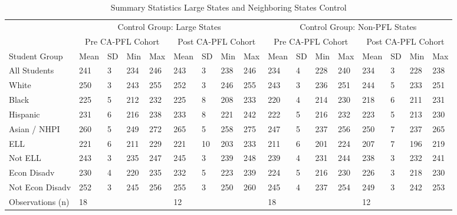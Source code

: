 \begin{table}[!h]
\centering
\caption{Summary Statistics Large States and Neighboring States Control}
\centering
\begin{tabular}[t]{lllllllllllllllll}
\toprule
\multicolumn{1}{c}{ } & \multicolumn{8}{c}{Control Group: Large States} & \multicolumn{8}{c}{Control Group: Non-PFL States} \\
\cmidrule(l{3pt}r{3pt}){2-9} \cmidrule(l{3pt}r{3pt}){10-17}
\multicolumn{1}{c}{ } & \multicolumn{4}{c}{Pre CA-PFL Cohort} & \multicolumn{4}{c}{Post CA-PFL Cohort} & \multicolumn{4}{c}{Pre CA-PFL Cohort} & \multicolumn{4}{c}{Post CA-PFL Cohort} \\
\cmidrule(l{3pt}r{3pt}){2-5} \cmidrule(l{3pt}r{3pt}){6-9} \cmidrule(l{3pt}r{3pt}){10-13} \cmidrule(l{3pt}r{3pt}){14-17}
Student Group & Mean & SD & Min & Max & Mean & SD & Min & Max & Mean & SD & Min & Max & Mean & SD & Min & Max\\
\midrule
All Students & 241 & 3 & 234 & 246 & 243 & 3 & 238 & 246 & 234 & 4 & 228 & 240 & 234 & 3 & 228 & 238\\
White & 250 & 3 & 243 & 255 & 252 & 3 & 246 & 255 & 243 & 3 & 236 & 251 & 244 & 5 & 233 & 251\\
Black & 225 & 5 & 212 & 232 & 225 & 8 & 208 & 233 & 220 & 4 & 214 & 230 & 218 & 6 & 211 & 231\\
Hispanic & 231 & 6 & 216 & 238 & 233 & 8 & 221 & 242 & 222 & 5 & 216 & 232 & 223 & 5 & 213 & 230\\
Asian / NHPI & 260 & 5 & 249 & 272 & 265 & 5 & 258 & 275 & 247 & 5 & 237 & 256 & 250 & 7 & 237 & 265\\
\addlinespace
ELL & 221 & 6 & 211 & 229 & 221 & 10 & 203 & 233 & 211 & 6 & 201 & 224 & 207 & 7 & 196 & 219\\
Not ELL & 243 & 3 & 235 & 247 & 245 & 3 & 239 & 248 & 239 & 4 & 231 & 244 & 238 & 3 & 232 & 241\\
Econ Disadv & 230 & 4 & 220 & 235 & 232 & 5 & 223 & 239 & 224 & 5 & 216 & 230 & 226 & 3 & 218 & 230\\
Not Econ Disadv & 252 & 3 & 245 & 256 & 255 & 3 & 250 & 260 & 245 & 4 & 237 & 254 & 249 & 3 & 242 & 253\\
Observations (n) & 18 &  &  &  & 12 &  &  &  & 18 &  &  &  & 12 &  &  & \\
\bottomrule
\end{tabular}
\end{table}
